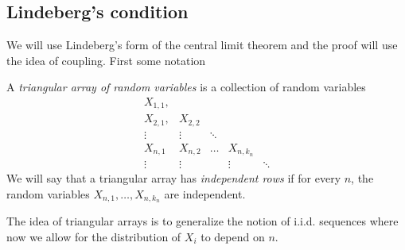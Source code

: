 \subsection{Lindeberg's condition}
We will use Lindeberg's form of the central limit theorem and the proof will use the idea of coupling. First some notation
\begin{defn}
    A \emph{triangular array of random variables} is a collection of random variables
    \[\begin{matrix}
        X_{1,1},\\
        X_{2,1}, &X_{2,2}\\
        \vdots & \vdots&\ddots \\
        X_{n,1} &X_{n,2} & \ldots &X_{n,k_n}\\
        \vdots &\vdots & &\vdots&\ddots  
    \end{matrix} \] 
    We will say that a triangular array has \emph{independent rows} if for every $n$, the random variables $X_{n,1},\ldots,X_{n,k_n}$ are independent.
\end{defn}
The idea of triangular arrays is to generalize the notion of i.i.d. sequences where now we allow for the distribution of $X_i$ to depend on $n$.

